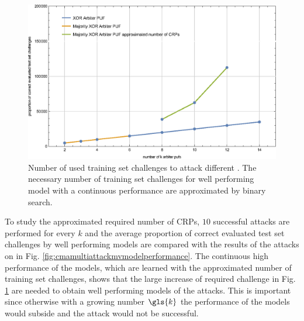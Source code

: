 \begin{figure}[ht]
\includegraphics[width=1.00\textwidth]{images/xor-cma-attack-crps.eps}
\caption[Number of used training set challenges]{Number of used training set challenges to attack different \pufs. The necessary number of training set challenges for well performing model with a continuous performance are approximated by binary search.}
\label{fig:cmamultiattackrequiredcrp}
\end{figure}

To study the approximated required number of \acp{CRP}, $10$ successful attacks are performed for every $k$ and the average proportion of correct evaluated test set challenges by well performing models are compared with the results of the attacks on \xpufs in Fig. \ref{fig:cmamultiattackmvmodelperformance}.
The continuous high performance of the models, which are learned with the approximated number of training set challenges, shows that the large increase of required challenge in Fig. \ref{fig:cmamultiattackrequiredcrp} are needed to obtain well performing models of the attacks.
This is important since otherwise with a growing number $\gls{k}$ the performance of the models would subside and the attack would not be successful.

